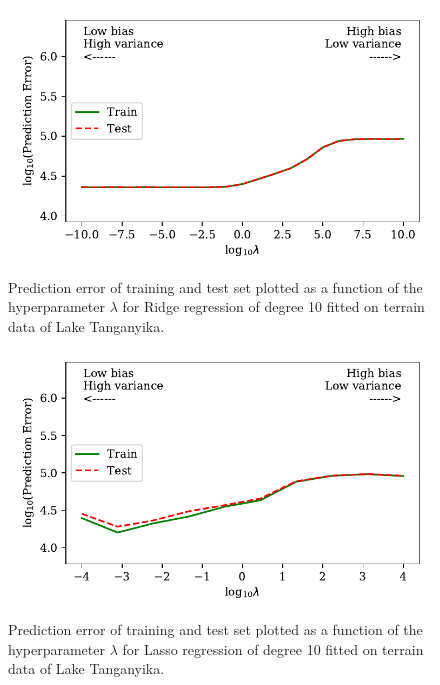 \documentclass[a4paper, 10pt]{article}
\begin{document}
\begin{figure}[H]
    \includegraphics{figs/biasvariancetradeoff_Ridge_terrain.pdf}
    \caption{Prediction error of training and test set plotted as a function of the hyperparameter $\lambda$ for Ridge regression of degree 10 fitted on terrain data of Lake Tanganyika.}
    \label{fig:bias_ridge_terrain}
\end{figure}

\begin{figure}[H]
    \includegraphics{figs/biasvariancetradeoff_LASSO_terrain.pdf}
    \caption{Prediction error of training and test set plotted as a function of the hyperparameter $\lambda$ for Lasso regression of degree 10 fitted on terrain data of Lake Tanganyika.}
    \label{fig:bias_lasso_terrain}
\end{figure}
\end{document}
